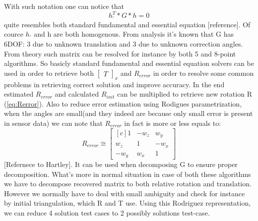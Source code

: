 With such notation one can notice that
\begin{equation} \label{eq:alternativeEnhancedEquation}
{h}_{'}^{T} * G * h = 0
\end{equation}
quite resembles both standard fundamental and essential equation [reference]. Of cource $h_{'}$ and h are both homogenous. From analysis it's known that G has 6DOF: 3 due to unknown translation and 3 due to unknown correction angles. From theory such matrix can be resolved for instance by both 5 and 8-point algorithms. So basicly standard fundamental and essential equation solvers can be used in order to retrieve both $\begin{bmatrix}T\end{bmatrix}_{x}$ and $R_{error}$ in order to resolve some common problems in retrieving correct solution and improve accuracy. 
In the end estimated $R_{error}$ and calculated $R_{init}$ can be multiplied to retrieve new rotation R (\ref{eq:Rerror}).
Also to reduce error estimation using Rodigues parametrization, when the angles are small(and they indeed are because only small error is present in sensor data) we can note that $R_{error}$ in fact is more or less equals to:
\begin{equation}
R_{error} \cong 
\begin{bmatrix*}[c]
 1& -w_{z}  &w_{y}\\ 
 w_{z} &1  & -w_{x}\\
  -w_{y}&  w_{x}&1
\end{bmatrix*}
\end{equation} 
[Refernece to Hartley]. It can be used when decomposing G to ensure proper decomposition. What's more in normal situation in case of both these algorithms we have to decompose recovered matrix to both relative rotation and translation. However we normally have to deal with small ambiguity and check for instance by initial triangulation, which R and T use. Using this Rodriguez representation, we can reduce 4 solution test cases to 2 possibly solutions test-case.
